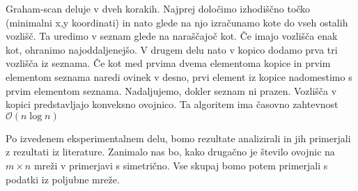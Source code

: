 \documentclass[a4paper]{article}
\begin{document}
Graham-scan deluje v dveh korakih. Najprej določimo izhodiščno točko (minimalni x,y koordinati) in nato glede na njo izračunamo kote do vseh ostalih vozlišč. Ta uredimo
v seznam glede na naraščajoč kot. Če imajo vozlišča enak kot, ohranimo najoddaljenejšo. V drugem delu nato v kopico dodamo prva tri vozlišča iz seznama.
Če kot med prvima dvema elementoma kopice in prvim elementom seznama naredi ovinek v desno, prvi element iz kopice nadomestimo s prvim elementom seznama. Nadaljujemo,
dokler seznam ni prazen. Vozlišča v kopici predstavljajo konveksno ovojnico. Ta algoritem ima časovno zahtevnost $\mathcal{O}(n\log{n})$

Po izvedenem eksperimentalnem delu, bomo rezultate analizirali in jih primerjali z rezultati iz literature. Zanimalo nas bo, kako drugačno je število ovojnic na $m \times n$
mreži v primerjavi s simetrično.  Vse skupaj bomo potem primerjali s podatki iz poljubne mreže.
\end{document}
